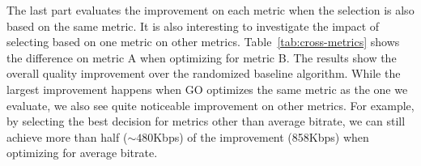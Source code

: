 \begin{figure}[h!]
\centering
{}
\hspace{-0.6cm}
\hspace{-0.6cm}
\hspace{-0.6cm}
\label{fig:improve}
\end{figure}


The last part evaluates the improvement on each metric when the selection is also based on the same metric. It is also interesting to investigate the impact of selecting based on one metric on other metrics. Table~\ref{tab:cross-metrics} shows the difference on metric A when optimizing for metric B. The results show the overall quality improvement over the randomized baseline algorithm. 
While the largest improvement happens when GO optimizes the same metric as the one we evaluate, we also see quite noticeable improvement on other metrics. For example, by selecting the best decision for metrics other than average bitrate, we can still achieve more than half ($\sim 480$Kbps) of the improvement (858Kbps) when optimizing for average bitrate.

